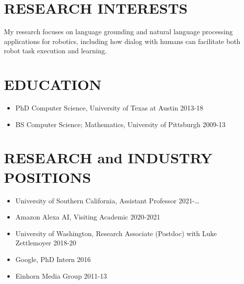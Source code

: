 \documentclass{res}
\newcommand{\citehref}[2]{\href{#1}{\color{darkblue}{#2}}}
\begin{document}
\thispagestyle{empty} %

\address{\citehref{https://jessethomason.com/}{jessethomason.com} \\
thomason.jesse@gmail.com}     

\address{ }

\begin{resume}

\section{RESEARCH INTERESTS}
My research focuses on language grounding and natural language processing applications for robotics, including how dialog with humans can facilitate both robot task execution and learning.

\section{EDUCATION}

\begin{itemize}
  \item PhD Computer Science, University of Texas at Austin \hfill 2013-18
  \item BS Computer Science; Mathematics, University of Pittsburgh \hfill 2009-13
 \end{itemize}

 \section{RESEARCH and INDUSTRY POSITIONS}

  \begin{itemize}
    \item University of Southern California, Assistant Professor \hfill 2021-\dots
    \item Amazon Alexa AI, Visiting Academic \hfill 2020-2021
    \item University of Washington, Research Associate (Postdoc) with Luke Zettlemoyer \hfill 2018-20
    \item Google, PhD Intern \hfill 2016
    \item Einhorn Media Group \hfill 2011-13
   \end{itemize}


\end{resume}
\end{document}
